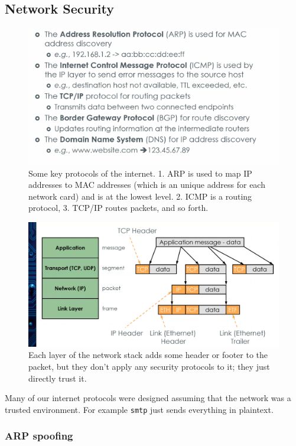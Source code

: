 \documentclass[../notes.tex]{subfiles}
\begin{document}
\subsection{Network Security}



\begin{figure}[H]
    \centering
    \includegraphics[width=0.8\linewidth]{img/image_2023-03-28-16-30-18.png}
    \caption{Some key protocols of the internet. 1. ARP is used to map IP addresses to MAC addresses (which is an unique address for each network card) and is at the lowest level. 2. ICMP is a routing protocol, 3. TCP/IP routes packets, and so forth.}
\end{figure}



\begin{figure}[H]
    \centering
    \includegraphics[width=0.8\linewidth]{img/image_2023-03-28-16-31-56.png}
    \caption{Each layer of the network stack adds some header or footer to the packet, but they don't apply any security protocols to it; they just directly trust it.}
\end{figure}

Many of our internet protocols were designed assuming that the network was a trusted environment. For example \texttt{smtp} just sends everything in plaintext.


\subsubsection{ARP spoofing}
\end{document}
